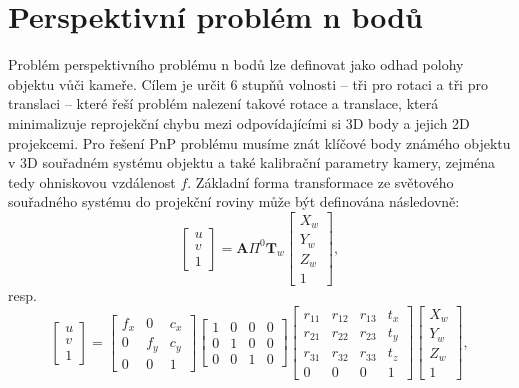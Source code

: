 \section{Perspektivní problém n bodů}
\label{sec:Chapter22}
Problém perspektivního problému n bodů lze definovat jako odhad polohy objektu vůči kameře. Cílem je určit 6 stupňů volnosti -- tři pro rotaci a tři pro translaci -- které řeší problém nalezení takové rotace a translace, která minimalizuje reprojekční chybu mezi odpovídajícími si 3D body a jejich 2D projekcemi. Pro řešení PnP problému musíme znát klíčové body známého objektu v 3D souřadném systému objektu a také kalibrační parametry kamery, zejména tedy ohniskovou vzdálenost $f$. Základní forma transformace ze světového souřadného systému do projekční roviny může být definována následovně:
\begin{equation}
\begin{bmatrix} u \\ v \\ 1 \end{bmatrix} = \mathbf{A} \Pi^0 \mathbf{T}_w \begin{bmatrix} X_w \\ Y_w \\ Z_w \\ 1 \end{bmatrix},
\end{equation}
resp.
\begin{equation}
    \begin{bmatrix} u \\ v \\ 1 \end{bmatrix} = \begin{bmatrix} f_x & 0 & c_x \\ 0 & f_y & c_y \\ 0 & 0 & 1 \end{bmatrix} \begin{bmatrix} 1 & 0 & 0 & 0 \\ 0 & 1 & 0 & 0 \\ 0 & 0 & 1 & 0 \end{bmatrix} \begin{bmatrix} r_{11} & r_{12} & r_{13} & t_x \\ r_{21} & r_{22} & r_{23} & t_y \\ r_{31} & r_{32} & r_{33} & t_z \\ 0 & 0 & 0 & 1 \end{bmatrix} \begin{bmatrix} X_w \\ Y_w \\ Z_w \\ 1 \end{bmatrix},
\end{equation}
